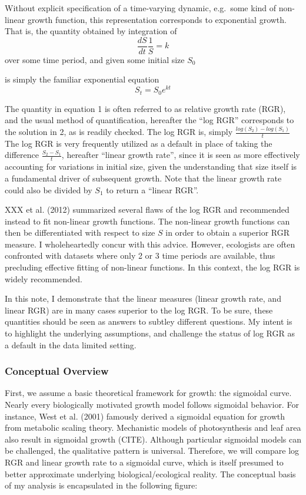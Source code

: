 \documentclass[]{article}
\begin{document}
Without explicit specification of a time-varying dynamic, e.g.~some kind
of non-linear growth function, this representation corresponds to
exponential growth. That is, the quantity obtained by integration of
\[\frac{dS}{dt}\frac{1}{S} = k\] over some time period, and given some
initial size \(S_0\)

is simply the familiar exponential equation \[S_t = S_0e^{kt}\]

The quantity in equation 1 is often referred to as relative growth rate
(RGR), and the usual method of quantification, hereafter the ``log RGR''
corresponds to the solution in 2, as is readily checked. The log RGR is,
simply \(\frac{log(S_2) - log(S_1)}{t}\) The log RGR is very frequently
utilized as a default in place of taking the difference
\(\frac{S_2 - S_1}{t}\), hereafter ``linear growth rate'', since it is
seen as more effectively accounting for variations in initial size,
given the understanding that size itself is a fundamental driver of
subsequent growth. Note that the linear growth rate could also be
divided by \(S_1\) to return a ``linear RGR''.

XXX et al. (2012) summarized several flaws of the log RGR and
recommended instead to fit non-linear growth functions. The non-linear
growth functions can then be differentiated with respect to size \(S\)
in order to obtain a superior RGR measure. I wholeheartedly concur with
this advice. However, ecologists are often confronted with datasets
where only 2 or 3 time periods are available, thus precluding effective
fitting of non-linear functions. In this context, the log RGR is widely
recommended.

In this note, I demonstrate that the linear measures (linear growth
rate, and linear RGR) are in many cases superior to the log RGR. To be
sure, these quantities should be seen as answers to subtley different
questions. My intent is to highlight the underlying assumptions, and
challenge the status of log RGR as a default in the data limited
setting.

\subsubsection{Conceptual Overview}\label{conceptual-overview}

First, we assume a basic theoretical framework for growth: the sigmoidal
curve. Nearly every biologically motivated growth model follows
sigmoidal behavior. For instance, West et al. (2001) famously derived a
sigmoidal equation for growth from metabolic scaling theory. Mechanistic
models of photosynthesis and leaf area also result in sigmoidal growth
(CITE). Although particular sigmoidal models can be challenged, the
qualitative pattern is universal. Therefore, we will compare log RGR and
linear growth rate to a sigmoidal curve, which is itself presumed to
better approximate underlying biological/ecological reality. The
conceptual basis of my analysis is encapsulated in the following figure:
\end{document}
